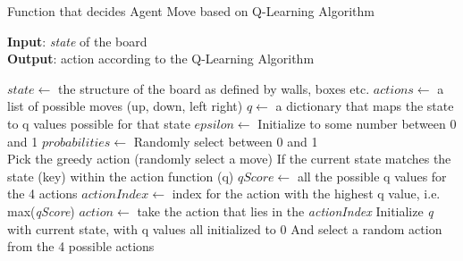 \documentclass{article}
\begin{document}
\begin{algorithm}
    \caption{Function that decides Agent Move based on Q-Learning Algorithm}\label{euclid}
    \hspace*{\algorithmicindent} \textbf{Input}: \emph{state} of the board \\
    \hspace*{\algorithmicindent} \textbf{Output}: action according to the Q-Learning  Algorithm \\
    \begin{algorithmic}
    \State $state \gets$ the structure of the board as defined by walls, boxes etc.
    \State $actions \gets$ a list of possible moves (up, down, left right)
    \State $q \gets$ a dictionary that maps the state to q values possible for that state
    \State $epsilon \gets$ Initialize to some number between 0 and 1
    \State $probabilities \gets$ Randomly select between 0 and 1 \\
        \State Pick the greedy action (randomly select a move)
    \Else
        \If If the current state matches the state (key) within the action function (q) %
            \State $qScore \gets$ all the possible q values for the 4 actions
            \State $actionIndex \gets$ index for the action with the highest q value, i.e. max(\emph{qScore})
            \State $action \gets$ take the action that lies in the \emph{actionIndex}
        \Else
            \State Initialize \emph{q} with current state, with q values all initialized to 0
            \State And select a random action from the 4 possible actions
        \EndIf
    \EndIf 
    \end{algorithmic}
\end{algorithm}
\end{document}
